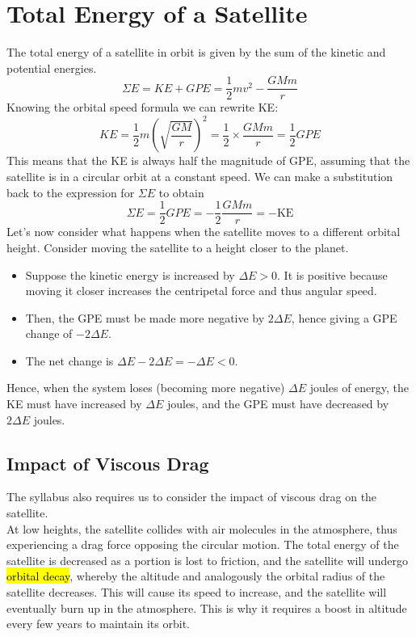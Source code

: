 \documentclass[a4paper,12pt]{article}
\let\oldsection\section
\renewcommand\section{\clearpage\oldsection}
\newcommand{\lb}{\\[8pt]}
\newcommand{\paren}[1]{\left(#1\right)}
\begin{document}
\section{Total Energy of a Satellite}

The total energy of a satellite in orbit is given by the sum of the kinetic and potential energies.
$$\Sigma E = KE + GPE = \frac{1}{2}mv^2 - \frac{GMm}{r}$$
Knowing the orbital speed formula we can rewrite KE:
$$KE = \frac{1}{2}m\paren{\sqrt{\frac{GM}{r}}}^2 = \frac{1}{2}\times \frac{GMm}{r} = \frac{1}{2} GPE$$
This means that the KE is always half the magnitude of GPE, assuming that the satellite is in a circular orbit at a constant speed. We can make a substitution back to the expression for $\Sigma E$ to obtain
\begin{equation}\label{eq:total_energy}
  \Sigma E = \frac{1}{2}GPE = -\frac{1}{2} \frac{GMm}{r} = -\text{KE}
\end{equation}
Let's now consider what happens when the satellite moves to a different orbital height. Consider moving the satellite to a height closer to the planet.
\begin{itemize}
  \item Suppose the kinetic energy is increased by $\Delta E > 0$. It is positive because moving it closer increases the centripetal force and thus angular speed.
  \item Then, the GPE must be made more negative by $2\Delta E$, hence giving a GPE change of $-2\Delta E$.
  \item The net change is $\Delta E - 2\Delta E = -\Delta E < 0$.
\end{itemize}
Hence, when the system loses (becoming more negative) $\Delta E$ joules of energy, the KE must have increased by $\Delta E$ joules, and the GPE must have decreased by $2\Delta E$ joules.

\pagebreak

\subsection{Impact of Viscous Drag}

The syllabus also requires us to consider the impact of viscous drag on the satellite.\lb
At low heights, the satellite collides with air molecules in the atmosphere, thus experiencing a drag force opposing the circular motion. The total energy of the satellite is decreased as a portion is lost to friction, and the satellite will undergo \hl{orbital decay}, whereby the altitude and analogously the orbital radius of the satellite decreases. This will cause its speed to increase, and the satellite will eventually burn up in the atmosphere. This is why it requires a boost in altitude every few years to maintain its orbit.
\end{document}
